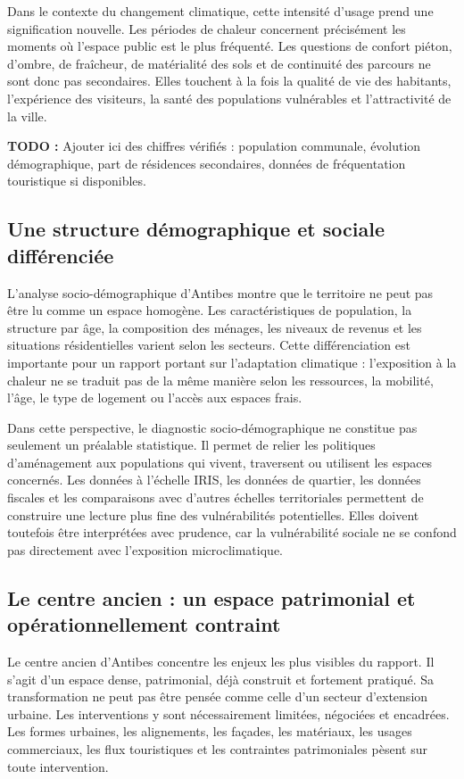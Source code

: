 \documentclass[11pt,a4paper]{report}
\newcommand{\todo}[1]{\textcolor{todored}{\textbf{TODO :} #1}}
\begin{document}
Dans le contexte du changement climatique, cette intensité d'usage prend une signification nouvelle. Les périodes de chaleur concernent précisément les moments où l'espace public est le plus fréquenté. Les questions de confort piéton, d'ombre, de fraîcheur, de matérialité des sols et de continuité des parcours ne sont donc pas secondaires. Elles touchent à la fois la qualité de vie des habitants, l'expérience des visiteurs, la santé des populations vulnérables et l'attractivité de la ville.

\todo{Ajouter ici des chiffres vérifiés : population communale, évolution démographique, part de résidences secondaires, données de fréquentation touristique si disponibles.}

\subsection{Une structure démographique et sociale différenciée}

L'analyse socio-démographique d'Antibes montre que le territoire ne peut pas être lu comme un espace homogène. Les caractéristiques de population, la structure par âge, la composition des ménages, les niveaux de revenus et les situations résidentielles varient selon les secteurs. Cette différenciation est importante pour un rapport portant sur l'adaptation climatique : l'exposition à la chaleur ne se traduit pas de la même manière selon les ressources, la mobilité, l'âge, le type de logement ou l'accès aux espaces frais.

Dans cette perspective, le diagnostic socio-démographique ne constitue pas seulement un préalable statistique. Il permet de relier les politiques d'aménagement aux populations qui vivent, traversent ou utilisent les espaces concernés. Les données à l'échelle IRIS, les données de quartier, les données fiscales et les comparaisons avec d'autres échelles territoriales permettent de construire une lecture plus fine des vulnérabilités potentielles. Elles doivent toutefois être interprétées avec prudence, car la vulnérabilité sociale ne se confond pas directement avec l'exposition microclimatique.

\subsection{Le centre ancien : un espace patrimonial et opérationnellement contraint}

Le centre ancien d'Antibes concentre les enjeux les plus visibles du rapport. Il s'agit d'un espace dense, patrimonial, déjà construit et fortement pratiqué. Sa transformation ne peut pas être pensée comme celle d'un secteur d'extension urbaine. Les interventions y sont nécessairement limitées, négociées et encadrées. Les formes urbaines, les alignements, les façades, les matériaux, les usages commerciaux, les flux touristiques et les contraintes patrimoniales pèsent sur toute intervention.
\end{document}
